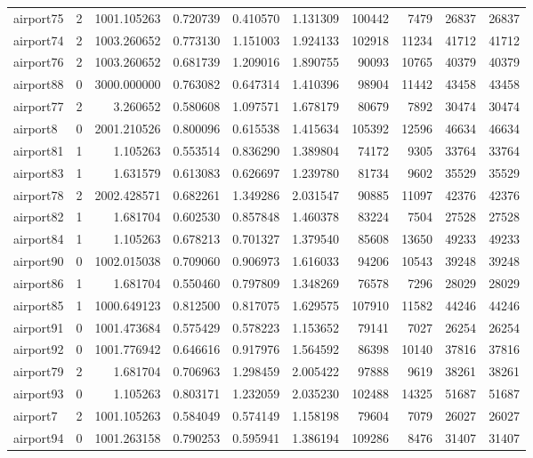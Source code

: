 \begin{longtable}{|l|r|r|r|r|r|r|r|r|r|}
airport75 & 2 & 1001.105263 & 0.720739 & 0.410570 & 1.131309 & 100442 & 7479 & 26837 & 26837 \\
airport74 & 2 & 1003.260652 & 0.773130 & 1.151003 & 1.924133 & 102918 & 11234 & 41712 & 41712 \\
airport76 & 2 & 1003.260652 & 0.681739 & 1.209016 & 1.890755 & 90093 & 10765 & 40379 & 40379 \\
airport88 & 0 & 3000.000000 & 0.763082 & 0.647314 & 1.410396 & 98904 & 11442 & 43458 & 43458 \\
airport77 & 2 & 3.260652 & 0.580608 & 1.097571 & 1.678179 & 80679 & 7892 & 30474 & 30474 \\
airport8 & 0 & 2001.210526 & 0.800096 & 0.615538 & 1.415634 & 105392 & 12596 & 46634 & 46634 \\
airport81 & 1 & 1.105263 & 0.553514 & 0.836290 & 1.389804 & 74172 & 9305 & 33764 & 33764 \\
airport83 & 1 & 1.631579 & 0.613083 & 0.626697 & 1.239780 & 81734 & 9602 & 35529 & 35529 \\
airport78 & 2 & 2002.428571 & 0.682261 & 1.349286 & 2.031547 & 90885 & 11097 & 42376 & 42376 \\
airport82 & 1 & 1.681704 & 0.602530 & 0.857848 & 1.460378 & 83224 & 7504 & 27528 & 27528 \\
airport84 & 1 & 1.105263 & 0.678213 & 0.701327 & 1.379540 & 85608 & 13650 & 49233 & 49233 \\
airport90 & 0 & 1002.015038 & 0.709060 & 0.906973 & 1.616033 & 94206 & 10543 & 39248 & 39248 \\
airport86 & 1 & 1.681704 & 0.550460 & 0.797809 & 1.348269 & 76578 & 7296 & 28029 & 28029 \\
airport85 & 1 & 1000.649123 & 0.812500 & 0.817075 & 1.629575 & 107910 & 11582 & 44246 & 44246 \\
airport91 & 0 & 1001.473684 & 0.575429 & 0.578223 & 1.153652 & 79141 & 7027 & 26254 & 26254 \\
airport92 & 0 & 1001.776942 & 0.646616 & 0.917976 & 1.564592 & 86398 & 10140 & 37816 & 37816 \\
airport79 & 2 & 1.681704 & 0.706963 & 1.298459 & 2.005422 & 97888 & 9619 & 38261 & 38261 \\
airport93 & 0 & 1.105263 & 0.803171 & 1.232059 & 2.035230 & 102488 & 14325 & 51687 & 51687 \\
airport7 & 2 & 1001.105263 & 0.584049 & 0.574149 & 1.158198 & 79604 & 7079 & 26027 & 26027 \\
airport94 & 0 & 1001.263158 & 0.790253 & 0.595941 & 1.386194 & 109286 & 8476 & 31407 & 31407 \\

\end{longtable}
